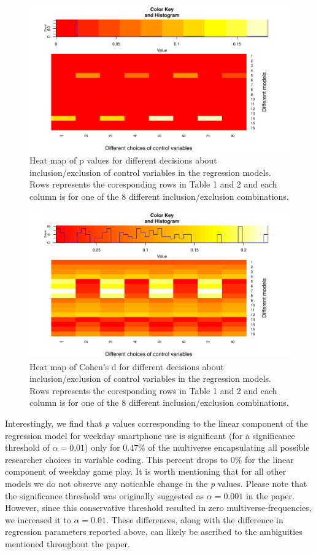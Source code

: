 \documentclass[man]{apa6}
\theoremstyle{definition}
\theoremstyle{definition}
\theoremstyle{definition}
\theoremstyle{remark}
\begin{document}
\begin{figure}
\centering
\includegraphics{stats_6_final_files/figure-latex/heat-p-model-1.pdf}
\caption{\label{fig:heat-p-model}Heat map of p values for different
decisions about inclusion/exclusion of control variables in the
regression models. Rows represents the coresponding rows in Table 1 and
2 and each column is for one of the 8 different inclusion/exclusion
combinations.}
\end{figure}

\begin{figure}
\centering
\includegraphics{stats_6_final_files/figure-latex/heat-d-model-1.pdf}
\caption{\label{fig:heat-d-model}Heat map of Cohen's d for different
decisions about inclusion/exclusion of control variables in the
regression models. Rows represents the coresponding rows in Table 1 and
2 and each column is for one of the 8 different inclusion/exclusion
combinations.}
\end{figure}

Interestingly, we find that \emph{p} values corresponding to the linear
component of the regression model for weekday smartphone use is
significant (for a significance threshold of \(\alpha = 0.01\)) only for
\(0.47\%\) of the multiverse encapsulating all possible researcher
choices in variable coding. This percent drops to \(0\%\) for the linear
component of weekday game play. It is worth mentioning that for all
other models we do not observe any noticable change in the \emph{p}
values. Please note that the significance threshold was originally
suggested as \(\alpha = 0.001\) in the paper. However, since this
conservative threshold resulted in zero multiverse-frequencies, we
increased it to \(\alpha = 0.01\). These differences, along with the
difference in regression parameters reported above, can likely be
ascribed to the ambiguities mentioned throughout the paper.
\end{document}
